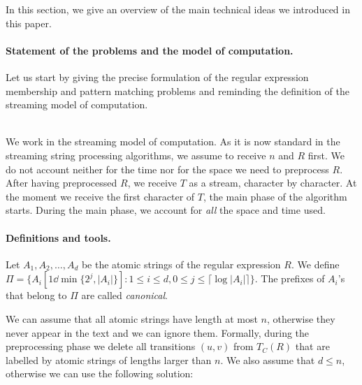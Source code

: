 In this section, we give an overview of the main technical ideas we introduced in this paper. 

\paragraph{Statement of the problems and the model of computation.} Let us start by giving the precise formulation of the regular expression membership and pattern matching problems and reminding the definition of the streaming model of computation. 

\\

We work in the streaming model of computation. As it is now standard in the streaming string processing algorithms, we assume to receive $n$ and $R$ first. We do not account neither for the time nor for the space we need to preprocess $R$. After having preprocessed $R$, we receive $T$ as a stream, character by character. At the moment we receive the first character of $T$, the main phase of the algorithm starts. During the main phase, we account for \emph{all} the space and time used. 

\paragraph{Definitions and tools.} 
Let $A_1, A_2, \ldots, A_d$ be the atomic strings of the regular expression $R$. We define $\Pi = \{A_i[1 \dd \min\{2^j, |A_i|\}] : 1\le  i \le d, 0 \le j \le \lceil \log |A_i|\rceil\}$. The prefixes of $A_i$'s that belong to $\Pi$ are called \emph{canonical}.

We can assume that all atomic strings have length at most $n$, otherwise they never appear in the text and we can ignore them. Formally, during the preprocessing phase we delete all transitions $(u,v)$ from $T_C(R)$ that are labelled by atomic strings of lengths larger than $n$. We also assume that $d \le n$, otherwise we can use the following solution:

